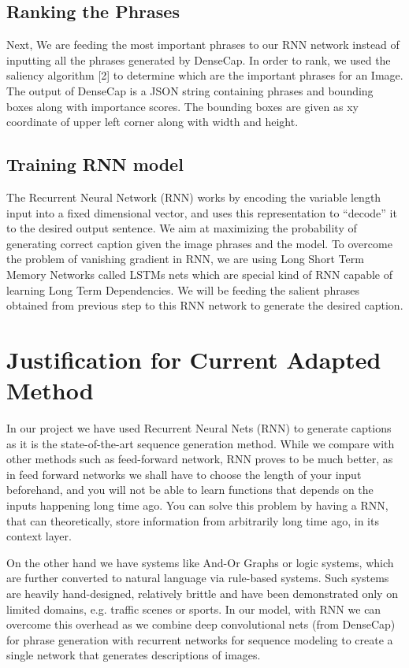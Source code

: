 \documentclass[11pt]{article}
\begin{document}
\subsection{Ranking the Phrases}
Next, We are feeding the most important phrases to our RNN network instead of inputting all the phrases generated by DenseCap. In order to rank, we used the saliency algorithm [2] to determine which are the important phrases for an Image. The output of DenseCap is a JSON string containing phrases and bounding boxes along with importance scores. The bounding boxes are given as xy coordinate of upper left corner along with width and height.
\subsection{Training RNN model}
The Recurrent Neural Network (RNN) works by encoding the variable length input into a fixed dimensional vector, and uses this representation to “decode” it to the desired output sentence. We aim at maximizing the probability of generating correct caption given the image phrases and the model. To overcome the problem of vanishing gradient in RNN, we are using Long Short Term Memory Networks called LSTMs nets which are special kind of RNN capable of learning Long Term Dependencies. We will be feeding the salient phrases obtained from previous step to this RNN network to generate the desired caption.

\section{Justification for Current Adapted Method}
In our project we have used Recurrent Neural Nets (RNN) to generate captions as it is the state-of-the-art sequence generation method. While we compare with other methods such as feed-forward network, RNN proves to be much better, as in feed forward networks we shall have to choose the length of your input beforehand, and you will not be able to learn functions that depends on the inputs happening long time ago. You can solve this problem by having a RNN, that can theoretically, store information from arbitrarily long time ago, in its context layer.

On the other hand we have systems like And-Or Graphs or logic systems, which are further converted to natural language via rule-based systems. Such systems are heavily hand-designed, relatively brittle and have been demonstrated only on limited domains, e.g. traffic scenes or sports. In our model, with RNN we can overcome this overhead as we combine deep convolutional nets (from DenseCap) for phrase generation with recurrent networks for sequence modeling to create a single network that generates descriptions of images.
 
\end{document}
